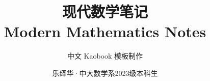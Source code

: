 \documentclass[
	leqno,
	a4paper, %
	fontsize=12pt, %
	twoside=false, %
	open=any, %
	chapterentrydots=true, %
	numbers=noenddot, %
    UTF-8, %
	toc=nottotoc,
	BCOR=12mm,
	DIV=calc,
]{styles/kaobook}
\begin{document}
\subject{使用此文档作为模板}

\title[示例及说明文档 {\normalfont\texttt{kaobook}} 类]{现代数学笔记\\Modern Mathematics Notes}
\subtitle{中文 Kaobook 模板制作}

\author[乐绎华]{乐绎华·中大数学系2023级本科生}

\date{\zhtoday}

\publishers{Sun Yat-sen University}


\frontmatter %



\dedication{
	世界的和谐体现在形式和数量上，自然哲学的心和灵魂以及一切诗歌都体现在数学美的概念上。\\
	\flushright -- D'Arcy Wentworth Thompson
}


\begin{titlepage} %
\begin{flushleft} %
	\setlength{\leftskip}{1cm} %
	\makeatletter %
	\vspace*{4cm} %
	{\color{titlecolorcoverpage}\Huge \textbf{\@title} \par} %
	\vspace{1cm} %
	{\color{titlecolorcoverpage}\Large\@subtitle \par} %
	\vfill %
	{\color{white}\large{\@author}\par} %
	{\color{white}\large \@publishers \par} %
	{\color{white}\large \zhtoday\par} %
	\makeatother %
	\vspace{0cm} %
\end{flushleft}
\ClearShipoutPicture %
\end{titlepage}
\end{document}
